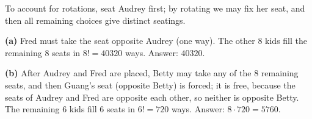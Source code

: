 To account for rotations, seat Audrey first; by rotating we may fix her seat, and then all remaining choices give distinct seatings.

\textbf{(a)} Fred must take the seat opposite Audrey (one way). The other $8$ kids fill the remaining $8$ seats in $8!=40320$ ways. Answer: $\boxed{40320}$.

\textbf{(b)} After Audrey and Fred are placed, Betty may take any of the $8$ remaining seats, and then Guang's seat (opposite Betty) is forced; it is free, because the seats of Audrey and Fred are opposite each other, so neither is opposite Betty. The remaining $6$ kids fill $6$ seats in $6!=720$ ways. Answer: $8\cdot720=\boxed{5760}$.
